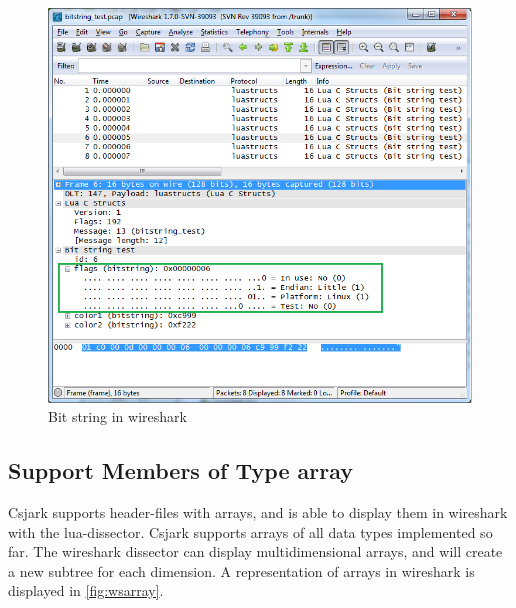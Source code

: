 \begin{figure}[ht]
	\center
	\includegraphics[width=\textwidth]{./sprints/img/wireshark_bitstring}
	\caption{Bit string in \Gls{wireshark}\label{fig:wsbitstring}}
\end{figure}



\subsection{Support Members of Type \Gls{array}}
Csjark supports \gls{header}-files with \glspl{array}, and is able to display them in 
\Gls{wireshark} with the \Gls{lua}-\gls{dissector}. Csjark supports \glspl{array} of all data types 
implemented so far. The \Gls{wireshark} \gls{dissector} can display multidimensional 
\glspl{array}, and will create a new subtree for each dimension.  A representation of 
\glspl{array} in \Gls{wireshark} is displayed in \autoref{fig:wsarray}.

